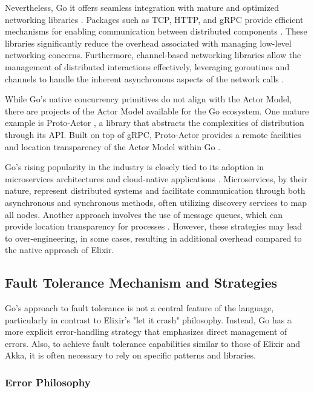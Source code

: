 Nevertheless, Go it offers seamless integration with mature and optimized networking libraries \cite{Kennedy2016}. Packages such as \gls{TCP}, \gls{HTTP}, and \gls{gRPC} provide efficient mechanisms for enabling communication between distributed components \cite{Castro2019, go-docs}. These libraries significantly reduce the overhead associated with managing low-level networking concerns. Furthermore, channel-based networking libraries allow the management of distributed interactions effectively, leveraging goroutines and channels to handle the inherent asynchronous aspects of the network calls \cite{Castro2019}.

While Go’s native concurrency primitives do not align with the Actor Model, there are projects of the Actor Model available for the Go ecosystem. One mature example is Proto-Actor \cite{Whitney2019,proto-actor-docs}, a library that abstracts the complexities of distribution through its \gls{API}. Built on top of \gls{gRPC}, Proto-Actor provides a remote facilities and location transparency of the Actor Model within Go \cite{proto-actor-docs}.

Go’s rising popularity in the industry is closely tied to its adoption in microservices architectures and cloud-native applications \cite{Zhao2023,Shuiskov2022}. Microservices, by their nature, represent distributed systems and facilitate communication through both asynchronous and synchronous methods, often utilizing discovery services to map all nodes. Another approach involves the use of message queues, which can provide location transparency for processes \cite{Shuiskov2022}. However, these strategies may lead to over-engineering, in some cases, resulting in additional overhead compared to the native approach of Elixir.

\subsection{Fault Tolerance Mechanism and Strategies}

Go's approach to fault tolerance is not a central feature of the language, particularly in contrast to Elixir's "let it crash" philosophy. Instead, Go has a more explicit error-handling strategy that emphasizes direct management of errors. Also, to achieve fault tolerance capabilities similar to those of Elixir and Akka, it is often necessary to rely on specific patterns and libraries.

\subsubsection{Error Philosophy}

